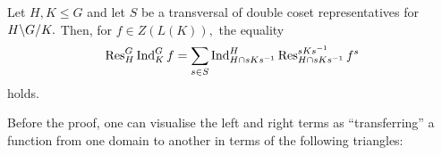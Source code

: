 \begin{thm}[Mackey] \label{thm:mackey}
	Let $H, K \le G$ and let $S$ be a transversal of double coset representatives for $\dcos{H}{G}{K}.$ Then, for $f \in Z(L(K)),$ the equality
	\begin{equation*} 
		\operatorname{Res}^{G}_{H}\operatorname{Ind}^{G}_{K}f = \sum_{s \in S} \operatorname{Ind}^{H}_{H \cap sKs^{-1}}\operatorname{Res}^{sKs^{-1}}_{H \cap sKs^{-1}}f^s
	\end{equation*}
	holds.
\end{thm}
Before the proof, one can visualise the left and right terms as ``transferring'' a function from one domain to another in terms of the following triangles:
\begin{center}
\end{center}
